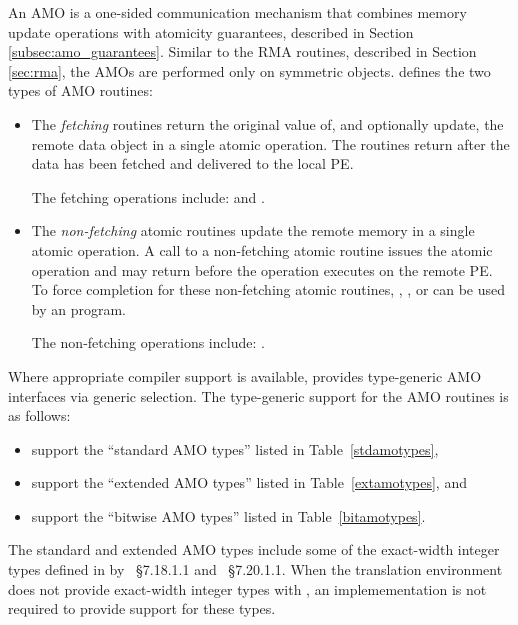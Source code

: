 An \ac{AMO} is a one-sided communication mechanism that combines memory update
operations with atomicity guarantees, described in Section
\ref{subsec:amo_guarantees}.  Similar to the \ac{RMA} routines, described in
Section \ref{sec:rma}, the \acp{AMO} are performed only on symmetric objects.
\openshmem defines the two types of \ac{AMO} routines:
\begin{itemize}
\item
The \textit{fetching} routines return the original value of, and optionally
update, the remote data object in a single atomic operation.  The routines
return after the data has been fetched and delivered to the local \ac{PE}.

The fetching operations include:
 and
.

\item
The \textit{non-fetching} atomic routines update the remote memory in a single
atomic operation.  A call to a non-fetching atomic routine issues the atomic
operation and may return before the operation executes on the remote \ac{PE}.
To force completion for these non-fetching atomic routines,
, , or  can
be used by an \openshmem program.

The non-fetching operations include:
.
\end{itemize}

Where appropriate compiler support is available, \openshmem provides
type-generic \ac{AMO} interfaces via \Cstd[11] generic selection.
The type-generic support for the \ac{AMO} routines is as follows:

\begin{itemize}
\item {} support
      the ``standard \ac{AMO} types'' listed in Table~\ref{stdamotypes},
\item {} support
      the ``extended \ac{AMO} types'' listed in Table~\ref{extamotypes}, and
\item {}
      support the ``bitwise \ac{AMO} types'' listed in Table~\ref{bitamotypes}.
\end{itemize}

The standard and extended \ac{AMO} types include some of the exact-width
integer types defined in  by \Cstd[99]~\S7.18.1.1 and
\Cstd[11]~\S7.20.1.1. When the \Cstd translation environment
does not provide exact-width integer types with , an
\openshmem implemementation is not required to provide support for these types.

